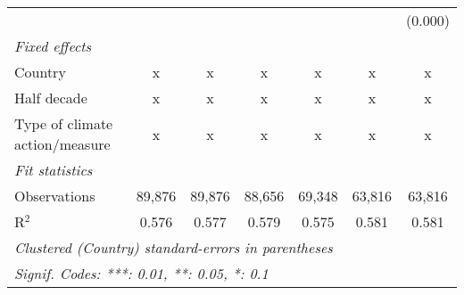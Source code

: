 \begin{tabular}{lcccccc}
                                                              &         &               &               &               &               & (0.000)\\   
   \emph{Fixed effects}\\
   Country                                                    & x       & x             & x             & x             & x             & x\\  
   Half decade                                                & x       & x             & x             & x             & x             & x\\  
   Type of climate action/measure                             & x       & x             & x             & x             & x             & x\\  
   \midrule \emph{Fit statistics}\\
   Observations                                               & 89,876  & 89,876        & 88,656        & 69,348        & 63,816        & 63,816\\  
   R$^2$                                                      & 0.576   & 0.577         & 0.579         & 0.575         & 0.581         & 0.581\\  
   \midrule
   \multicolumn{7}{l}{\emph{Clustered (Country) standard-errors in parentheses}}\\
   \multicolumn{7}{l}{\emph{Signif. Codes: ***: 0.01, **: 0.05, *: 0.1}}\\
\end{tabular}
\par\endgroup


